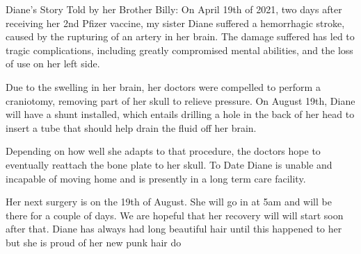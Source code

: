 Diane's Story Told by her Brother Billy: On April 19th of 2021, two days after
receiving her 2nd Pfizer vaccine, my sister Diane suffered a hemorrhagic stroke,
caused by the rupturing of an artery in her brain. The damage suffered has led
to tragic complications, including greatly compromised mental abilities, and the
loss of use on her left side.

Due to the swelling in her brain, her doctors were compelled to perform a
craniotomy, removing part of her skull to relieve pressure. On August 19th,
Diane will have a shunt installed, which entails drilling a hole in the back of
her head to insert a tube that should help drain the fluid off her brain.

Depending on how well she adapts to that procedure, the doctors hope to
eventually reattach the bone plate to her skull. To Date Diane is unable and
incapable of moving home and is presently in a long term care facility.

Her next surgery is on the 19th of August. She will go in at 5am and will be
there for a couple of days. We are hopeful that her recovery will will start
soon after that. Diane has always had long beautiful hair until this happened to
her but she is proud of her new punk hair do

